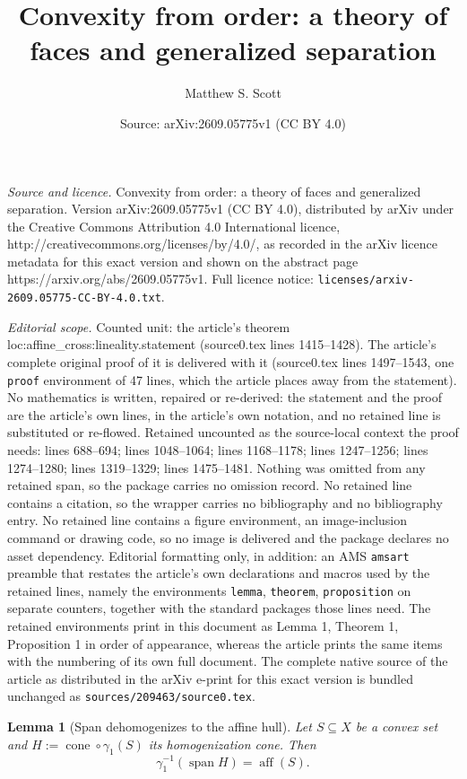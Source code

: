 \documentclass[10pt,a4paper]{amsart}
\title{Convexity from order: a theory of faces and generalized separation}
\author{Matthew S. Scott}
\date{Source: arXiv:2609.05775v1 (CC BY 4.0)}
\newtheorem{lemma}{Lemma}
\DeclareMathOperator{\Span}{\mathrm{span}}
\DeclareMathOperator{\aff}{aff}
\DeclareMathOperator{\cone}{cone}
\begin{document}
\maketitle

\noindent\emph{Source and licence.} Convexity from order: a theory of faces and generalized separation. Version arXiv:2609.05775v1 (CC BY 4.0), distributed by arXiv under the Creative Commons Attribution 4.0 International licence, http://creativecommons.org/licenses/by/4.0/, as recorded in the arXiv licence metadata for this exact version and shown on the abstract page https://arxiv.org/abs/2609.05775v1. Full licence notice: \texttt{licenses/arxiv-2609.05775-CC-BY-4.0.txt}.\par\smallskip

\noindent\textit{Editorial scope.} Counted unit: the article's theorem loc:affine\_cross:lineality.statement (source0.tex lines 1415--1428). The article's complete original proof of it is delivered with it (source0.tex lines 1497--1543, one \texttt{proof} environment of 47 lines, which the article places away from the statement). No mathematics is written, repaired or re-derived: the statement and the proof are the article's own lines, in the article's own notation, and no retained line is substituted or re-flowed.  Retained uncounted as the source-local context the proof needs: lines 688--694; lines 1048--1064; lines 1168--1178; lines 1247--1256; lines 1274--1280; lines 1319--1329; lines 1475--1481.  Nothing was omitted from any retained span, so the package carries no omission record.  No retained line contains a citation, so the wrapper carries no bibliography and no bibliography entry.  No retained line contains a figure environment, an image-inclusion command or drawing code, so no image is delivered and the package declares no asset dependency.  Editorial formatting only, in addition: an AMS \texttt{amsart} preamble that restates the article's own declarations and macros used by the retained lines, namely the environments \texttt{lemma}, \texttt{theorem}, \texttt{proposition} on separate counters, together with the standard packages those lines need.  The retained environments print in this document as Lemma 1, Theorem 1, Proposition 1 in order of appearance, whereas the article prints the same items with the numbering of its own full document.  The complete native source of the article as distributed in the arXiv e-print for this exact version is bundled unchanged as \texttt{sources/209463/source0.tex}.
\begin{lemma}[Span dehomogenizes to the affine hull]
\label{loc:span_dehomogenizes_to_the_affine_hull.statement}
Let $S \subseteq X$ be a convex set and $H := \cone \circ \gamma_1(S)$ its homogenization cone. Then
\begin{equation*}
\gamma_1^{-1}(\Span H) = \aff(S).
\end{equation*}
\end{lemma}
\end{document}
